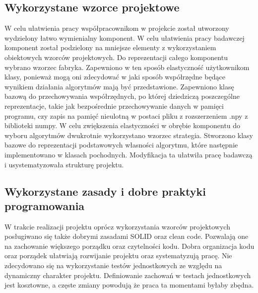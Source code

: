 \documentclass[oneside, eng]{mgr}
\begin{document}
\subsection{Wykorzystane wzorce projektowe}

W celu ułatwienia pracy współpracownikom w projekcie został utworzony wydzielony łatwo wymienialny komponent. W celu ułatwienia pracy badawczej komponent został podzielony na mniejsze elementy z wykorzystaniem obiektowych wzorców projektowych.
Do reprezentacji całego komponentu wybrano wzorzec fabryka. Zapewniono w ten sposób elastyczność użytkownikom klasy, ponieważ mogą oni zdecydować w jaki sposób współrzędne będące wynikiem działania algorytmów mają być przedstawione. Zapewniono klasę bazową do przechowywania współrzędnych, po której dziedziczą poszczególne reprezentacje, takie jak bezpośrednie przechowywanie danych w pamięci programu, czy zapis na pamięć nieulotną w postaci pliku z rozszerzeniem .npy z biblioteki numpy.
W celu zwiększenia elastyczności w obrębie komponentu do wyboru algorytmów dwukrotnie wykorzystano wzorzec strategia. Stworzono klasy bazowe do reprezentacji podstawowych własności algorytmu, które następnie implementowano w klasach pochodnych. Modyfikacja ta ułatwiła pracę badawczą i usystematyzowała strukturę projektu.

\subsection{Wykorzystane zasady i dobre praktyki programowania}

W trakcie realizacji projektu oprócz wykorzystania wzorców projektowych posługiwano się także dobrymi zasadami SOLID oraz clean code. Pozwalają one na zachowanie większego porządku oraz czytelności kodu. Dobra organizacja kodu oraz porządek ułatwiają rozwijanie projektu oraz systematyzują pracę. Nie zdecydowano się na wykorzystanie testów jednostkowych ze względu na dynamiczny charakter projektu. Definiowanie zachowań w testach jednostkowych jest kosztowne, a częste zmiany powodują że praca ta momentami byłaby zbędna.
\end{document}
